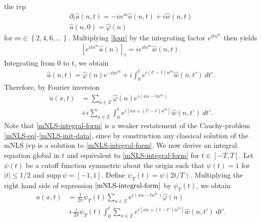 \documentclass[12pt,reqno]{amsart}
\numberwithin{equation}{section}  %
\numberwithin{figure}{section}
\newcommand{\zz}{\mathbb{Z}}
\newcommand{\wh}{\widehat}
\newcommand{\p}{\partial}
\newcommand{\vp}{\varphi}
\theoremstyle{plain}
\theoremstyle{definition}
\theoremstyle{remark}
\begin{document}
the ivp
\begin{gather}
  \label{four}
  \p_t \widehat{u}(n, t) = -i n^m \widehat{u}(n, t) + i  
  \widehat{w} (n, t)
	\\
  \label{four-init-data}
	\widehat{u} (n,0) = \widehat{\vp}(n)
\end{gather}
for $ m \in \left\{ 2, 4, 6, \dots \right\}$.
Multiplying \eqref{four} by the integrating factor $e^{itn^m}$ then yields
\begin{equation*}
	\begin{split}
		\left[ e^{ it n^m} \widehat{u}(n) \right]_t = i
		 e^{ it n^m} \widehat{w} (n, t).	
	\end{split}
\end{equation*}
%
%
Integrating from $0$ to $t$, we obtain
%
%
\begin{equation*}
	\begin{split}
		\wh{u}(n, t) = \wh{\vp}(n) e^{- it n^m} + i  
		\int_0^t e^{ i(t' - t) n^m} \wh{w}(n, t') \ 
		dt'.
	\end{split}
\end{equation*}
%
%
Therefore, by Fourier inversion 
%
%
\begin{equation}
	\label{mNLS-integral-form}
	\begin{split}
		u(x,t) & = \sum_{n \in \zz} \wh{\vp}(n) e^{i\left( xn - t n^m 
		\right)} 
		\\
		& + i \sum_{n \in \zz} \int_0^t e^{i\left[ xn + \left( t' - t 
		\right) n^m \right]} \wh{w}(n, t') \ dt'.
	\end{split}
\end{equation}
%
%
Note that \eqref{mNLS-integral-form} is a weaker 
restatement of the Cauchy-problem \eqref{mNLS-eq}-\eqref{mNLS-init-data}, 
since by construction any classical solution of the mNLS 
ivp is a solution to \eqref{mNLS-integral-form}. 
%
%
We now derive an integral 
equation global in $t$ and equivalent to \eqref{mNLS-integral-form} for $t 
\in [-T, T]$. Let $\psi(t)$ be a cutoff function symmetric about the 
origin such that $\psi(t) = 1$ for $|t| \le 1/2$ and $\text{supp} \, \psi 
= [-1, 1 ]$. Define $\psi_{T}(t) = \psi(2t/T)$.  Multiplying the right hand side of expression
$\eqref{mNLS-integral-form}$ by $\psi_{T}(t)$, we obtain
%
%
\begin{equation}
	\begin{split}
		\label{cutoff-int-eq}
		u(x, t)
		& = \frac{1}{2 \pi} \psi_{T}(t) \sum_{n \in \zz} e^{i(xn - t n^{m })} \widehat{\vp}(n) 
		\\
		& + \frac{i }{2 \pi} \psi_{T}(t) \int_0^t \sum_{n \in \zz} 
		e^{i\left[ xn + (t - t')n^m \right]} \wh{w}(n, t') \ dt'.
	\end{split}
\end{equation}
\end{document}
